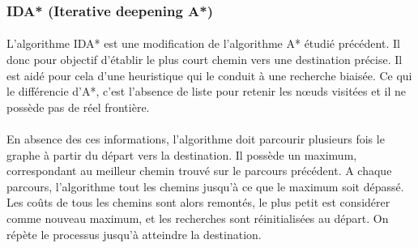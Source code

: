 \documentclass[pidr]{tnreport}
\begin{document}
			\subsubsection{IDA* (Iterative deepening A*)}
\paragraph{}
L'algorithme IDA* est une modification de l'algorithme A* étudié précédent. Il donc pour objectif d'établir le plus court chemin vers une destination précise. Il est aidé pour cela d'une heuristique qui le conduit à une recherche biaisée. Ce qui le différencie d'A*, c'est l'absence de liste pour retenir les nœuds visitées et il ne possède pas de réel frontière. 

\paragraph{}
En absence des ces informations, l'algorithme doit parcourir plusieurs fois le graphe à partir du départ vers la destination. Il possède un maximum, correspondant au meilleur chemin trouvé sur le parcours précédent. A chaque parcours, l'algorithme tout les chemins jusqu'à ce que le maximum soit dépassé. Les coûts de tous les chemins sont alors remontés, le plus petit est considérer comme nouveau maximum, et les recherches sont réinitialisées au départ. On répète le processus jusqu'à atteindre la destination.   
\end{document}
